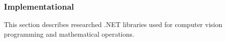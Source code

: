 \documentclass[../../../../main]{subfiles}
\begin{document}
\subsubsection{Implementational}

This section describes researched .NET libraries used for computer vision programming and mathematical operations.


\newpage


\newpage


\newpage
\end{document}
